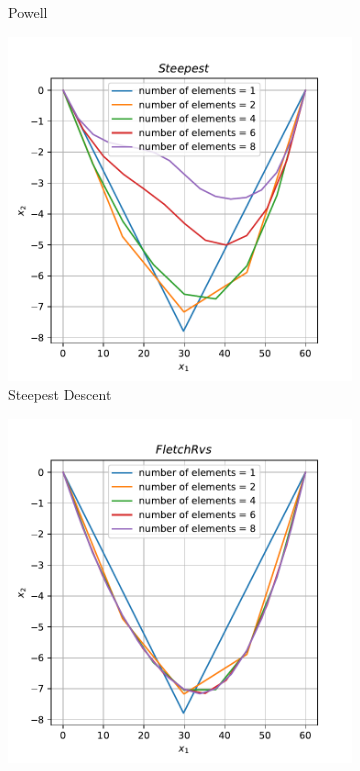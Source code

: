 \documentclass[10pt, a4paper]{article}
\begin{document}
\begin{figure}[htpb]
\begin{subfigure}[b]{0.32\textwidth}
    \caption{Powell}
    \label{fig:q2b_powell}
  \end{subfigure}
  \hfill
  \begin{subfigure}[b]{0.32\textwidth}
    \centering
    \includegraphics[width=\textwidth]{images/q2b_Steepest.pdf}
    \caption{Steepest Descent}
    \label{fig:q2b_steepest}
  \end{subfigure}
  \hfill
  \begin{subfigure}[b]{0.32\textwidth}
    \centering
    \includegraphics[width=\textwidth]{images/q2b_FletchRvs.pdf}

\end{subfigure}
\end{figure}
\end{document}
